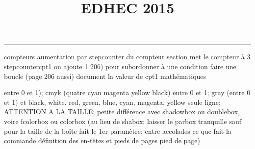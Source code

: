 \documentclass[11pt]{article}%
\title{\bf \vspace{-2cm} EDHEC 2015} %
\author{} %
\date{} %
\renewcommand{\headrulewidth}{0pt}%
\renewcommand{\footrulewidth}{0.4pt}%
\begin{document}
\maketitle %
\vspace{-1.4cm}\hrule %
\thispagestyle{fancy}

\vspace*{.2cm}



compteurs%
aumentation par stepcounter du compteur section%
met le compteur à 3%
stepcounter{cpt1} on ajoute 1%
206) pour subordonner à une condition %
faire une boucle (page 206 aussi) %
document la valeur de cpt1 
mathématiques\newcommand{\ch}{\operatorname{ch}} 
\newcommand{\sh}{\operatorname{sh}}
\renewcommand{\tanh}{\operatorname{th}}
\renewcommand{\sinh}{\operatorname{sh}}
\renewcommand{\cosh}{\operatorname{ch}}
\newcommand{\argsh}{\operatorname{argsh}}
\newcommand{\argch}{\operatorname{argch}}
\newcommand{\argth}{\operatorname{argth}}
\newcommand{\Id}{\operatorname{Id}}
\newcommand{\id}{\operatorname{id}}
\renewcommand{\im}{\operatorname{Im}}
\renewcommand{\leq}{\leq}
\renewcommand{\geq}{\geq }

\newcommand{\dlim}{\lim}
\newcommand{\dprod}{\prod}
\newcommand{\dsum}{\sum}
\newcommand{\dint}{\int}
\newcommand{\lb}{\llbracket}
\newcommand{\rb}{\rrbracket}







entre 0 et 1); cmyk (quatre cyan magenta yellow black) entre 0 et 1;
gray (entre 0 et 1) et black, white, red, green, blue, cyan, magenta,
yellow%
seule ligne; ATTENTION A LA TAILLE; petite différence avec shadowbox ou
doublebox, voire fcolorbox ou colorbox (au lieu de shabox; laisser le
parbox tranquille sauf pour la taille de la boîte
\newcommand{\Tbox}[1]{\begin{center} \shabox{\parbox{0.6
\linewidth}{#1}} \end{center}} %
fait le 1er paramètre; entre accolades ce que fait la commande
définition des en-têtes et pieds de pages\pagestyle{fancy}
\chead{}
\rfoot[ \ \thepage]{\thepage}
\cfoot{}
\lfoot{}
\thispagestyle{fancy} %
pied de page)\renewcommand{\footrulewidth}{0.4pt}
\renewcommand{\headrulewidth}{0.4pt}
\end{document}
